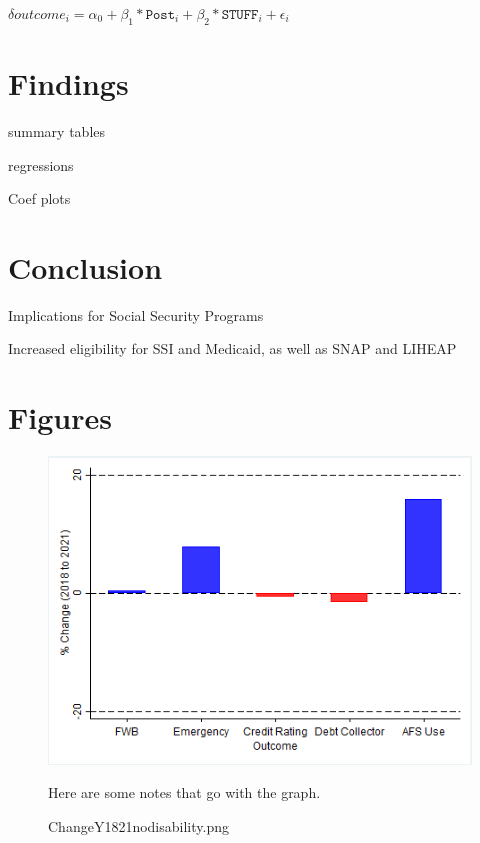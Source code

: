 \documentclass[12pt]{article}
\begin{document}
$\delta outcome_{i} = \alpha_0 + \beta_1*\texttt{Post}_i + \beta_2*\texttt{STUFF}_i + \epsilon_i $

 

\section{Findings}

summary tables

regressions

Coef plots
 

 
  

\section{Conclusion}
 
Implications for Social Security Programs
 
Increased eligibility for SSI and Medicaid, as well as SNAP and LIHEAP
 

\section{Figures}
 
 

\begin{figure}[!ht]\label{ChangeY_18_21_nodisability.png}
\caption{ChangeY1821nodisability.png}
\centering
\includegraphics[scale=0.65]{ChangeY_18_21_nodisability.png}
\medskip 
\begin{minipage}{0.65\textwidth} 
{\footnotesize Here are some notes that go with the graph.  \par}
\end{minipage}
\end{figure}
\end{document}
